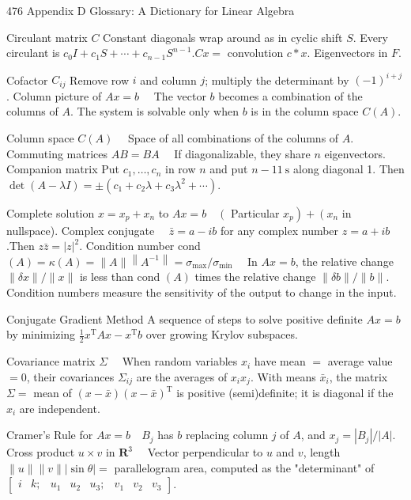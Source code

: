 476
Appendix D Glossary: A Dictionary for Linear Algebra

Circulant matrix $C$ Constant diagonals wrap around as in cyclic shift $S$. Every circulant is $c_0 I+c_1 S+\cdots+c_{n-1} S^{n-1} . C x=$ convolution $c * x$. Eigenvectors in $F$.

Cofactor $C_{i j}$ Remove row $i$ and column $j$; multiply the determinant by $(-1)^{i+j}$.
Column picture of $A x=b \quad$ The vector $b$ becomes a combination of the columns of $A$. The system is solvable only when $b$ is in the column space $C(A)$.

Column space $C(A) \quad$ Space of all combinations of the columns of $A$.
Commuting matrices $A B=B A \quad$ If diagonalizable, they share $n$ eigenvectors.
Companion matrix Put $c_1, \ldots, c_n$ in row $n$ and put $n-11 \mathrm{~s}$ along diagonal 1. Then $\operatorname{det}(A-\lambda I)= \pm\left(c_1+c_2 \lambda+c_3 \lambda^2+\cdots\right)$.

Complete solution $x=x_p+x_n$ to $A x=b \quad\left(\right.$ Particular $\left.x_p\right)+\left(x_n\right.$ in nullspace).
Complex conjugate $\quad \bar{z}=a-i b$ for any complex number $z=a+i b$.Then $z \bar{z}=|z|^2$.
Condition number cond $(A)=\kappa(A)=\|A\|\left\|A^{-1}\right\|=\sigma_{\max } / \sigma_{\min } \quad$ In $A x=b$, the relative change $\|\delta x\| /\|x\|$ is less than cond $(A)$ times the relative change $\|\delta b\| /\|b\|$. Condition numbers measure the sensitivity of the output to change in the input.

Conjugate Gradient Method A sequence of steps to solve positive definite $A x=b$ by minimizing $\frac{1}{2} x^{\mathrm{T}} A x-x^{\mathrm{T}} b$ over growing Krylov subspaces.

Covariance matrix $\Sigma \quad$ When random variables $x_i$ have mean $=$ average value $=0$, their covariances $\Sigma_{i j}$ are the averages of $x_i x_j$. With means $\bar{x}_i$, the matrix $\Sigma=$ mean of $(x-\bar{x})(x-\bar{x})^{\mathrm{T}}$ is positive (semi)definite; it is diagonal if the $x_i$ are independent.

Cramer's Rule for $A x=b \quad B_j$ has $b$ replacing column $j$ of $A$, and $x_j=\left|B_j\right| /|A|$.
Cross product $u \times v$ in $\mathbf{R}^3 \quad$ Vector perpendicular to $u$ and $v$, length $\|u\|\|v\||\sin \theta|=$ parallelogram area, computed as the "determinant" of $\left[\begin{array}{lllllllll}i & k ; & u_1 & u_2 & u_3 ; & v_1 & v_2 & v_3\end{array}\right]$.

